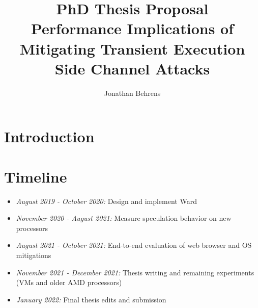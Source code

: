 \documentclass[letterpaper,12pt]{article}
\begin{document}

\date{\vspace{-\baselineskip}}
\title{\bf PhD Thesis Proposal \\ \large Performance Implications of Mitigating Transient Execution Side Channel Attacks}
\author{ {\rm Jonathan Behrens} }
\maketitle



\section{Introduction}


\newpage
\section{Timeline}
\begin{itemize}
\item\textit{August 2019 - October 2020:} Design and implement Ward
\item\textit{November 2020 - August 2021:} Measure speculation behavior on new processors
\item\textit{August 2021 - October 2021:} End-to-end evaluation of web browser and OS mitigations
\item\textit{November 2021 - December 2021:} Thesis writing and remaining experiments (VMs and older AMD processors)
\item\textit{January 2022:} Final thesis edits and submission
\end{itemize}

\pagebreak
{}

\end{document}
